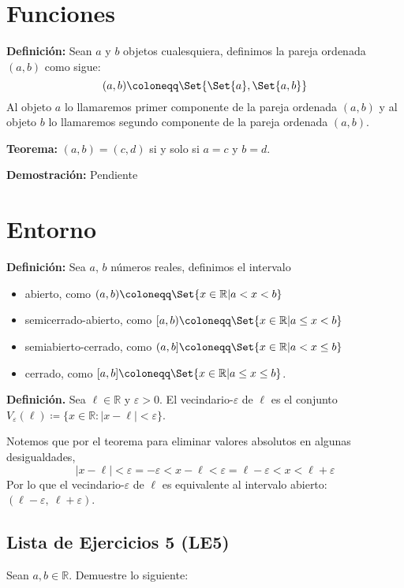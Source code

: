 \documentclass[11pt]{article}
\newcommand{\R}{\mathbb{R}}
\newcommand{\defined}{\coloneqq}
\let\epsilon\varepsilon
\let\set\Set
\begin{document}
\section*{Funciones}

\textbf{Definición:} Sean $a$ y $b$ objetos cualesquiera, definimos la pareja ordenada $(a,b)$ como sigue: \[
    (a,b)\coloneqq \set{\set{a}, \set{a,b}}\]
Al objeto $a$ lo llamaremos primer componente de la pareja ordenada $(a,b)$ y al objeto $b$ lo llamaremos segundo componente de la pareja ordenada $(a,b)$.

\textbf{Teorema:} $(a,b)=(c,d)$ si y solo si $a=c$ y $b=d$.

\textbf{Demostración:} Pendiente

\pagebreak

\section*{Entorno}

\textbf{Definición:} Sea $a$, $b$ números reales, definimos el intervalo \begin{itemize}
    \item abierto, como $(a,b)\defined \set{x\in \R| a<x<b}$
    \item semicerrado-abierto, como $[a,b)\defined \set{x\in \R|a\leq x <b}$
    \item semiabierto-cerrado, como $(a,b]\defined \set{x\in \R|a<x\leq b}$
    \item cerrado, como $[a,b]\defined \set{x\in \R|a\leq x\leq b}$.
\end{itemize}

\textbf{Definición.} Sea $\ell \in \R$ y $\varepsilon>0$. El vecindario-$\varepsilon$ de $\ell$ es el conjunto $V_\varepsilon(\ell)\defined \{ x\in \R: |x-\ell|<\varepsilon\}$.

Notemos que por el teorema para eliminar valores absolutos en algunas desigualdades, \[|x-\ell| < \epsilon= -\epsilon < x-\ell < \epsilon= \ell-\epsilon < x < \ell+\epsilon\]
Por lo que el vecindario-$\epsilon$ de $\ell$ es equivalente al intervalo abierto: $(\ell-\epsilon, \ \ell+\epsilon)$.

\subsection*{Lista de Ejercicios 5 (LE5)}

Sean $a,b \in \R$. Demuestre lo siguiente:
\end{document}
